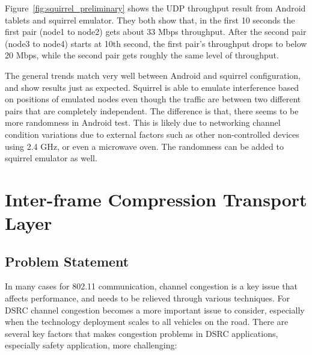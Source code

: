 \documentclass[12pt]{report}
\begin{document}
Figure~\ref{fig:squirrel_preliminary} shows the UDP throughput result from Android tablets and squirrel emulator. They both show that, in the first 10 seconds the first pair (node1 to node2) gets about 33 Mbps throughput. After the second pair (node3 to node4) starts at 10th second, the first pair's throughput drops to below 20 Mbps, while the second pair gets roughly the same level of throughput.

The general trends match very well between Android and squirrel configuration, and show results just as expected. Squirrel is able to emulate interference based on positions of emulated nodes even though the traffic are between two different pairs that are completely independent. The difference is that, there seems to be more randomness in Android test. This is likely due to networking channel condition variations due to external factors such as other non-controlled devices using 2.4 GHz, or even a microwave oven. The randomness can be added to squirrel emulator as well.

\chapter{Inter-frame Compression Transport Layer}

\section{Problem Statement}
\label{sec:problem_congestion}

In many cases for 802.11 communication, channel congestion is a key issue that affects performance, and needs to be relieved through various techniques. For DSRC channel congestion becomes a more important issue to consider, especially when the technology deployment scales to all vehicles on the road. There are several key factors that makes congestion problems in DSRC applications, especially safety application, more challenging:
\end{document}
